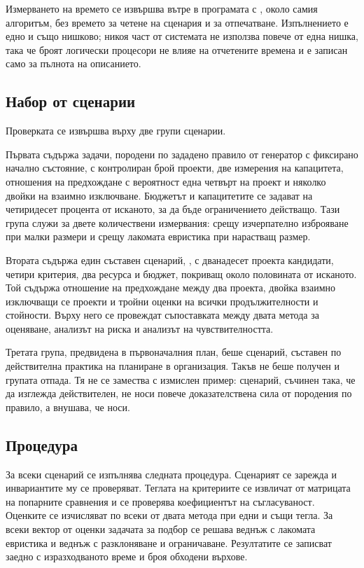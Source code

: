 Измерването на времето се извършва вътре в програмата с
, около самия алгоритъм, без времето за четене на
сценария и за отпечатване. Изпълнението е едно и също нишково; никоя част от
системата не използва повече от една нишка, така че броят логически процесори не
влияе на отчетените времена и е записан само за пълнота на описанието.

\subsection{Набор от сценарии}

Проверката се извършва върху две групи сценарии.

Първата съдържа задачи, породени по зададено правило от генератор с фиксирано
начално състояние, с контролиран брой проекти, две измерения на капацитета,
отношения на предхождане с вероятност една четвърт на проект и няколко двойки на
взаимно изключване. Бюджетът и капацитетите се задават на четиридесет процента от
исканото, за да бъде ограничението действащо. Тази група служи за двете
количествени измервания: срещу изчерпателно изброяване при малки размери и срещу
лакомата евристика при нарастващ размер.

Втората съдържа един съставен сценарий, , с
дванадесет проекта кандидати, четири критерия, два ресурса и бюджет, покриващ
около половината от исканото. Той съдържа отношение на предхождане между два
проекта, двойка взаимно изключващи се проекти и тройни оценки на всички
продължителности и стойности. Върху него се провеждат съпоставката между двата
метода за оценяване, анализът на риска и анализът на чувствителността.

Третата група, предвидена в първоначалния план, беше сценарий, съставен по
действителна практика на планиране в организация. Такъв не беше получен и
групата отпада. Тя не се замества с измислен пример: сценарий, съчинен така, че
да изглежда действителен, не носи повече доказателствена сила от породения по
правило, а внушава, че носи.

\subsection{Процедура}

За всеки сценарий се изпълнява следната процедура. Сценарият се зарежда и
инвариантите му се проверяват. Теглата на критериите се извличат от матрицата на
попарните сравнения и се проверява коефициентът на съгласуваност. Оценките се
изчисляват по всеки от двата метода при едни и същи тегла. За всеки вектор от
оценки задачата за подбор се решава веднъж с лакомата евристика и веднъж с
разклоняване и ограничаване. Резултатите се записват заедно с изразходваното
време и броя обходени върхове.

